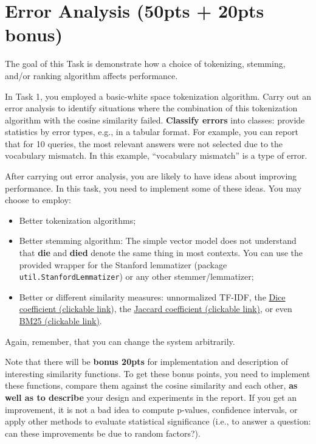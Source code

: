 \documentclass[oneside,11pt]{memoir}
\begin{document}
\chapter{Error Analysis (50pts + 20pts bonus)}
\label{SectionError}
The goal of this Task is demonstrate how a choice of tokenizing, stemming, and/or ranking
algorithm affects performance.

In Task 1, you employed a basic-white space tokenization algorithm.
Carry out an error analysis to identify situations where the
combination of this tokenization algorithm with the cosine similarity failed.
\textbf{Classify errors} into classes: provide statistics
by error types, e.g., in a tabular format.
For example, you can report that for 10 queries, the most relevant answers
were not selected due to the vocabulary mismatch. In this example,
``vocabulary mismatch'' is a type of error.

After carrying out error analysis,
you are likely to have ideas about improving performance.
In this task, you need to implement some of these ideas.
You may choose to employ:

\begin{itemize}
\item Better tokenization algorithms;
\item Better stemming algorithm: The simple vector model does not understand 
that \textbf{die} and \textbf{died} denote the same thing in most contexts.
You can use the provided wrapper for the Stanford lemmatizer (package \texttt{util.StanfordLemmatizer})
or any other stemmer/lemmatizer;
\item Better or different similarity measures: unnormalized TF-IDF,
the \href{http://en.wikipedia.org/wiki/S%C3%B8rensen%E2%80%93Dice_coefficient}{Dice coefficient (clickable link}), the \href{http://en.wikipedia.org/wiki/Jaccard_index}{Jaccard coefficient (clickable link)},
or even \href{http://en.wikipedia.org/wiki/Okapi_BM25}{BM25 (clickable link)}.
\end{itemize}
Again, remember, that you can change the system arbitrarily.

Note that there will be \textbf{bonus 20pts} for implementation and description
of interesting similarity functions. 
To get these bonus points, you need to 
implement these functions, compare them against the cosine similarity and each other,
\textbf{as well as to describe} your design and experiments in the report.
If you get an improvement, it is not a bad idea to compute p-values,
confidence intervals, or apply other methods to evaluate statistical significance (i.e.,
to answer a question: can these improvements be due to random factors?).
\end{document}
